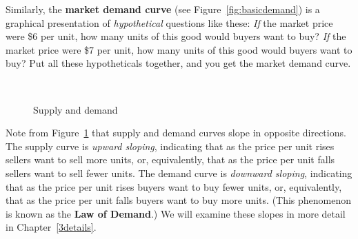 Similarly, the \textbf{market demand curve} (see Figure~\ref{fig:basicdemand}) is a graphical presentation of \emph{hypothetical} questions like these: \emph{If} the market price were \$6 per unit, how many units of this good would buyers want to buy? \emph{If} the market price were \$7 per unit, how many units of this good would buyers want to buy? Put all these hypotheticals together, and you get the market demand curve.

\begin{figure}[h]%
\centering
    \hspace{2cm}
    \\[2\baselineskip]
\caption{Supply and demand}
\label{fig:basicsupplydemand}
\end{figure}


Note from Figure~\ref{fig:basicsupplydemand} that supply and demand curves slope in opposite directions. The supply curve is \emph{upward sloping}, indicating that as the price per unit rises sellers want to sell more units, or, equivalently, that as the price per unit falls sellers want to sell fewer units. The demand curve is \emph{downward sloping}, indicating that as the price per unit rises buyers want to buy fewer units, or, equivalently, that as the price per unit falls buyers want to buy more units. (This phenomenon is known as the \textbf{Law of Demand}.) We will examine these slopes in more detail in Chapter~\ref{3details}.

